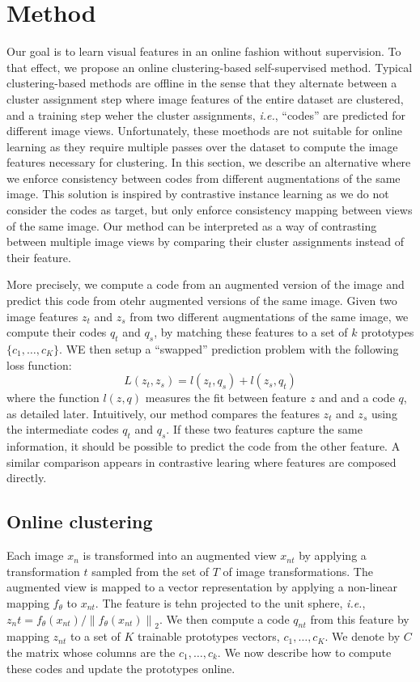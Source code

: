\documentclass[conference]{IEEEtran}
\begin{document}
\section{Method}
Our goal is to learn visual features in an online fashion without supervision. To that effect, we propose an online clustering-based self-supervised method.
Typical clustering-based methods are offline in the sense that they alternate between a cluster assignment step where image features of the entire dataset are clustered, and a training step weher the cluster assignments, 
\textit{i.e.}, ``codes'' are predicted for different image views. 
Unfortunately, these moethods are not suitable for online learning as they require multiple passes over the dataset to compute the image features necessary for clustering.
In this section, we describe an alternative where we enforce consistency between codes from different augmentations of the same image.
This solution is inspired by contrastive instance learning as we do not consider the codes as target, but only enforce consistency mapping between views of the same image.
Our method can be interpreted as a way of contrasting between multiple image views by comparing their cluster assignments instead of their feature.

More precisely, we compute a code from an augmented version of the image and predict this code from otehr augmented versions of the same image.
Given two image features $z_t$ and $z_s$ from two different augmentations of the same image, we compute their codes $q_t$ and $q_s$, by matching these features to a set of $k$ prototypes $\{c_1, \ldots, c_K\}$.
WE then setup a ``swapped'' prediction problem with the following loss function:
\begin{equation}
    L(z_t, z_s) = l(z_t, q_s)+l(z_s, q_t)
\end{equation}
where the function $l(z,q)$ measures the fit between feature $z$ and and a code $q$, as detailed later.
Intuitively, our method compares the features $z_t$ and $z_s$ using the intermediate codes $q_t$ and $q_s$. 
If these two features capture the same information, it should be possible to predict the code from the other feature.
A similar comparison appears in contrastive learing where features are composed directly.

\subsection{Online clustering}
Each image $x_n$ is transformed into an augmented view $x_{nt}$ by applying a transformation $t$ sampled from the set of $T$ of image transformations.
The augmented view is mapped to a vector representation by applying a non-linear mapping $f_\theta$ to $x_{nt}$.
The feature is tehn projected to the unit sphere, \textit{i.e.}, $z_nt = f_\theta (x_{nt})/ \left\lVert f_\theta(x_{nt})\right\rVert_2$.
We then compute a code $q_{nt}$ from this feature by mapping $z_{nt}$ to a set of $K$ trainable prototypes vectors, ${c_1, \ldots, c_K}$. 
We denote by $C$ the matrix whose columns are the $c_1, \ldots, c_k$. We now describe how to compute these codes and update the prototypes online.
\end{document}
